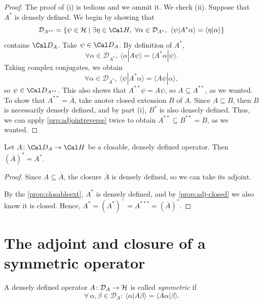 \begin{proof}
  The proof of (i) is tedious and we ommit it.
  We check (ii).
  Suppose that \(A^*\) is densely defined.
  We begin by showing that
  \begin{equation}
    \mathcal{D}_{A^{**}}=
    \{\psi\in \mathcal{H}\mid
    \exists\eta\in\Cal H,\
    \forall\alpha\in \mathcal{D}_{A^*}, \
    \langle \psi | A^*\alpha \rangle=\langle \eta | \alpha \rangle
    \}
  \end{equation}
  contains \(\Cal D_A\).
  Take \(\psi\in \Cal D_A\). By definition of \(A^*\),
  \begin{equation*}
    \forall \alpha \in\mathcal{D}_{A^*}, \
    \langle \alpha | A\psi \rangle =  \langle A^* \alpha | \psi \rangle.
  \end{equation*}
  Taking complex conjugates, we obtain
  \begin{equation*}
    \forall \alpha \in\mathcal{D}_{A^*}, \
    \langle \psi | A^* \alpha \rangle
    = 
    \langle A\psi | \alpha \rangle,
  \end{equation*}
  so \(\psi\in\Cal D_{A^{**}}\).
  This also shows that $A^{**}\psi= A\psi$, so $A\subseteq A^{**}$, as
  we wanted. To show that \(A^{**}=\overline{A}\),
  take anoter closed extension \(B\) of \(A\).
  Since \(A\subseteq B\), then \(B\) is necessarily densely defined,
  and by part (i), \(B^{*}\) is also densely defined.
  Thus, we can apply \cref{prp:adjointreverse} twice to obtain
  \(A^{**}\subseteq B^{**}=B\), as we wanted.
\end{proof}

\begin{corollary}
  Let \(A\colon \Cal D_A\to\Cal H\) be a closable, densely defined
  operator. Then \((\overline A)^{*}=A^{*}\).
\end{corollary}
\begin{proof}
  Since \(A\subseteq \overline A\), the closure \(\overline A\) is
  densely defined, so we can take its adjoint.

  By the \cref{prop:closableext}, \(A^{*}\) is densely defined, and by
  \cref{prop:adj-closed} we also know it is closed.
  Hence, \(A^{*}=(A^{*})^{-}=A^{***}=(\overline A)^{*}\).
\end{proof}

\section{The adjoint and closure of a symmetric operator}

\begin{definition}
A densely defined operator $A\colon\mathcal{D}_A\to\mathcal{H}$ is called \emph{symmetric} if
\begin{equation*}
\forall \, \alpha,\beta \in \mathcal{D}_A : \ \langle\alpha|A\beta\rangle = \langle A\alpha|\beta\rangle.
\end{equation*}
\end{definition}

